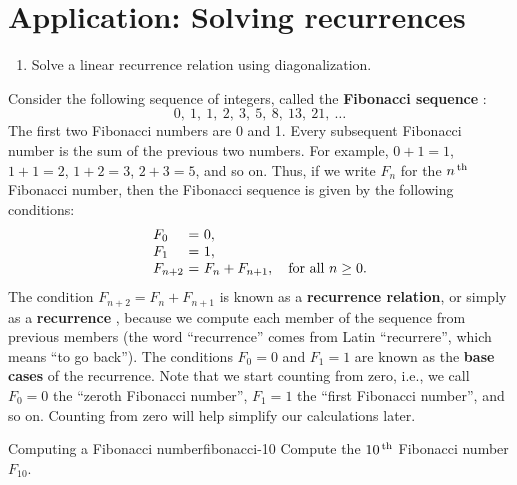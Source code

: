 \section{Application: Solving recurrences}
\label{sec:recurrence}

\begin{outcome}
  \begin{enumerate}
  \item Solve a linear recurrence relation using diagonalization.
  \end{enumerate}
\end{outcome}

Consider the following sequence of integers, called the
\textbf{Fibonacci sequence}%
%
%
:
\begin{equation*}
  0,\ 1,\ 1,\ 2,\ 3,\ 5,\ 8,\ 13,\ 21,\ \ldots
\end{equation*}
The first two Fibonacci numbers are 0 and 1. Every subsequent
Fibonacci number is the sum of the previous two numbers. For example,
$0+1=1$, $1+1=2$, $1+2=3$, $2+3=5$, and so on. Thus, if we write $F_n$ for the
$n^{\,\rm th}$ Fibonacci number, then the Fibonacci sequence is given by the
following conditions:
\begin{equation*}
  \begin{array}{l@{~}c@{~}l}
    F_0 &=& 0, \\
    F_1 &=& 1, \\
    F_{n+2} &=& F_{n} + F_{n+1}, \quad\mbox{for all $n\geq 0$.}\\
  \end{array}
\end{equation*}
The condition $F_{n+2} = F_{n} + F_{n+1}$ is known as a
\textbf{recurrence relation}, or simply as a \textbf{recurrence}%
%
, because we compute each
member of the sequence from previous members (the word ``recurrence''
comes from Latin ``recurrere'', which means ``to go back''). The
conditions $F_0=0$ and $F_1=1$ are known as the \textbf{base cases}%
%
 of the recurrence. Note that we
start counting from zero, i.e., we call $F_0=0$ the ``zeroth Fibonacci
number'', $F_1=1$ the ``first Fibonacci number'', and so on. Counting
from zero will help simplify our calculations later.

\begin{example}{Computing a Fibonacci number}{fibonacci-10}
  Compute the $10^{\,\rm th}$ Fibonacci number $F_{10}$.
\end{example}

